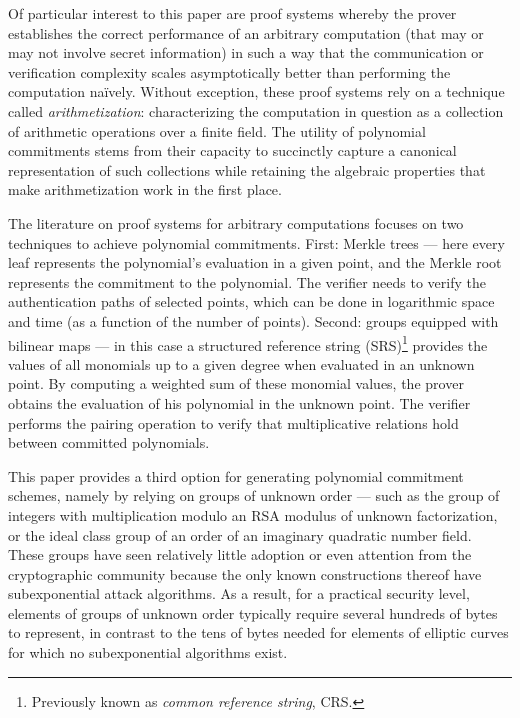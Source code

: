 \documentclass{article}
\theoremstyle{definition}
\begin{document}
Of particular interest to this paper are proof systems whereby the prover establishes the correct performance of an arbitrary computation (that may or may not involve secret information) in such a way that the communication or verification complexity scales asymptotically better than performing the computation naïvely. Without exception, these proof systems rely on a technique called \emph{arithmetization}: characterizing the computation in question as a collection of arithmetic operations over a finite field. The utility of polynomial commitments stems from their capacity to succinctly capture a canonical representation of such collections while retaining the algebraic properties that make arithmetization work in the first place.

The literature on proof systems for arbitrary computations focuses on two techniques to achieve polynomial commitments. First: Merkle trees --- here every leaf represents the polynomial's evaluation in a given point, and the Merkle root represents the commitment to the polynomial. The verifier needs to verify the authentication paths of selected points, which can be done in logarithmic space and time (as a function of the number of points). Second: groups equipped with bilinear maps --- in this case a structured reference string (SRS)\footnote{Previously known as \emph{common reference string}, CRS.} provides the values of all monomials up to a given degree when evaluated in an unknown point. By computing a weighted sum of these monomial values, the prover obtains the evaluation of his polynomial in the unknown point. The verifier performs the pairing operation to verify that multiplicative relations hold between committed polynomials.

This paper provides a third option for generating polynomial commitment schemes, namely by relying on groups of unknown order --- such as the group of integers with multiplication modulo an RSA modulus of unknown factorization, or the ideal class group of an order of an imaginary quadratic number field. These groups have seen relatively little adoption or even attention from the cryptographic community because the only known constructions thereof have subexponential attack algorithms. As a result, for a practical security level, elements of groups of unknown order typically require several hundreds of bytes to represent, in contrast to the tens of bytes needed for elements of elliptic curves for which no subexponential algorithms exist. 
\end{document}
